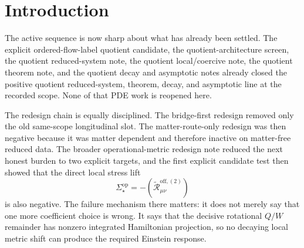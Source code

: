 \documentclass[11pt]{article}
\newcommand{\ReOffTwo}{\widetilde{\mathcal R}_{\mu\nu}^{\mathrm{off},(2)}}
\newcommand{\HamCharge}{\mathfrak m_{\mathrm H}}
\begin{document}
\begin{abstract}
On the decisive rotational regime,
\[
K\equiv0,
\qquad
Q^I\equiv0,
\qquad
\Omega_{ij}^T\not\equiv0,
\qquad
T_{\mu\nu}^{\mathrm{matter}}=0,
\]
the source charge is
\[
\HamCharge[\ReOffTwo]
=
\frac{\kappa_\Omega}{4}\int_{\mathbb R^3}\abs{\Omega^T}^2\,d^3x>0.
\]
The inverse-Einstein-response correction therefore necessarily carries the corresponding Coulomb tail. That is precisely how the new bridge map escapes the integrated Hamiltonian obstruction that killed the first local candidate: the nonzero source charge is not forced to vanish, but is carried by the asymptotic sector of the solve.

The verdict at current scope is positive but limited. The first decisive off-longitudinal and cubic longitudinal obstructions can be absorbed by a genuinely broader observer map, so the next burden is no longer another same-scope bridge-only, matter-route-only, or local stress-lift repair. Exact closure is still not proved, however, because the quartic-and-higher self-response, the asymptotic admissibility of the induced tail, and any first-principles substrate justification of this solve-defined bridge map remain open.
\end{abstract}

\section{Introduction}

The active sequence is now sharp about what has already been settled. The explicit ordered-flow-label quotient candidate, the quotient-architecture screen, the quotient reduced-system note, the quotient local/coercive note, the quotient theorem note, and the quotient decay and asymptotic notes already closed the positive quotient reduced-system, theorem, decay, and asymptotic line at the recorded scope. None of that PDE work is reopened here.

The redesign chain is equally disciplined. The bridge-first redesign removed only the old same-scope longitudinal slot. The matter-route-only redesign was then negative because it was matter dependent and therefore inactive on matter-free reduced data. The broader operational-metric redesign note reduced the next honest burden to two explicit targets, and the first explicit candidate test then showed that the direct local stress lift
\[
\Sigma^{\mathrm{op}}_\star=-(\ReOffTwo)
\]
is also negative. The failure mechanism there matters: it does not merely say that one more coefficient choice is wrong. It says that the decisive rotational \(Q/W\) remainder has nonzero integrated Hamiltonian projection, so no decaying local metric shift can produce the required Einstein response.
\end{document}
